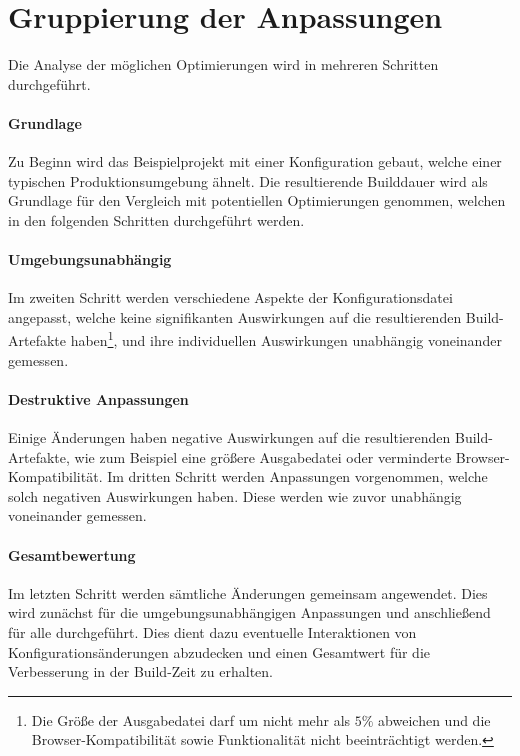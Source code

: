 \documentclass[11pt]{report}
\begin{document}
		\section{Gruppierung der Anpassungen}
			Die Analyse der möglichen Optimierungen wird in mehreren Schritten durchgeführt.
			\paragraph{Grundlage}\label{baseline-build} Zu Beginn wird das Beispielprojekt mit einer Konfiguration gebaut, welche einer typischen Produktionsumgebung ähnelt. Die resultierende Builddauer wird als Grundlage für den Vergleich mit potentiellen Optimierungen genommen, welchen in den folgenden Schritten durchgeführt werden.

			\paragraph{Umgebungsunabhängig} Im zweiten Schritt werden verschiedene Aspekte der Konfigurationsdatei angepasst, welche keine signifikanten Auswirkungen auf die resultierenden Build-Artefakte haben\footnote{Die Größe der Ausgabedatei darf um nicht mehr als $5\%$ abweichen und die Browser-Kompatibilität sowie Funktionalität nicht beeinträchtigt werden.}, und ihre individuellen Auswirkungen unabhängig voneinander gemessen.

			\paragraph{Destruktive Anpassungen} Einige Änderungen haben negative Auswirkungen auf die resultierenden Build-Artefakte, wie zum Beispiel eine größere Ausgabedatei oder verminderte Browser-Kompatibilität. Im dritten Schritt werden Anpassungen vorgenommen, welche solch negativen Auswirkungen haben. Diese werden wie zuvor unabhängig voneinander gemessen.

			\paragraph{Gesamtbewertung} Im letzten Schritt werden sämtliche Änderungen gemeinsam angewendet. Dies wird zunächst für die umgebungsunabhängigen Anpassungen und anschließend für alle durchgeführt. Dies dient dazu eventuelle Interaktionen von Konfigurationsänderungen abzudecken und einen Gesamtwert für die Verbesserung in der Build-Zeit zu erhalten.
\end{document}
